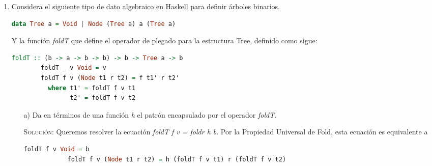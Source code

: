 \documentclass[letterpaper,11pt]{article}
\begin{document}
\begin{enumerate}
\begin{itemize}
\begin{proof}
\begin{itemize}
                \item Paso inductivo.
                \begin{align*}
                    foldr \; f \; e \; ((x:xs) \; ++ \; ys)
                    &= foldr \; f \; e \; (x:(xs++ys))
                    && \text{def. de $++$} \\ 
                    &= f \; x \; (foldr \; f \; e \; (xs++ys))
                    && \text{def. de foldr} \\ 
                    &= f \; x \; (foldr \; f \; (foldr \; f \; e \; ys) \; xs)
                    && \text{hipótesis de inducción} \\ 
                    &= foldr \; f \; (foldr \; f \; e \; ys) \; (x:xs)
                    && \text{def. de foldr}
                \end{align*}
            \end{itemize}
        \end{proof}
    \end{itemize}

    \item Considera el siguiente tipo de dato algebraico en Haskell para definir
    árboles binarios.
    \begin{lstlisting}[language=Haskell]
        data Tree a = Void | Node (Tree a) a (Tree a)
    \end{lstlisting}

    Y la función \textit{foldT} que define el operador de plegado para la 
    estructura Tree, definido como sigue:
    \begin{lstlisting}[language=Haskell]
        foldT :: (b -> a -> b -> b) -> b -> Tree a -> b
        foldT _ v Void = v
        foldT f v (Node t1 r t2) = f t1' r t2'
          where t1' = foldT f v t1 
                t2' = foldT f v t2
    \end{lstlisting}

    \begin{itemize}
        \item[a)] Da en términos de una función \textit{h} el patrón encapsulado
        por el operador \textit{foldT}.
        
        \textsc{Solución:} Queremos resolver la ecuación \textit{foldT f v = 
        foldr h b}. Por la Propiedad Universal de Fold, esta ecuación es 
        equivalente a 
        
        \begin{lstlisting}[language=Haskell]
            foldT f v Void = b
            foldT f v (Node t1 r t2) = h (foldT f v t1) r (foldT f v t2)
        \end{lstlisting}
        

\end{itemize}
\end{enumerate}
\end{document}
